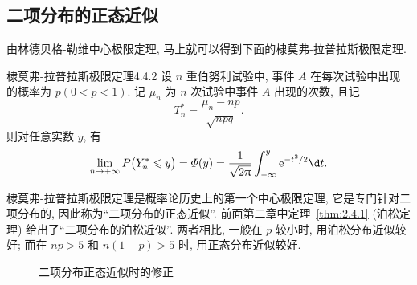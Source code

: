 \subsection{二项分布的正态近似}

由林德贝格-勒维中心极限定理, 马上就可以得到下面的棣莫弗-拉普拉斯极限定理.

\begin{theorem}{棣莫弗-拉普拉斯极限定理}{4.4.2}
    设 $n$ 重伯努利试验中, 事件 $A$ 在每次试验中出现的概率为 $ p (0<p<1) $.
    记 $ \mu_n $ 为 $n$ 次试验中事件 $A$ 出现的次数, 且记
    \begin{equation*}
        T_n^* = \frac{\mu_n - np}{\sqrt{npq}}.
    \end{equation*}
    则对任意实数 $y$, 有
    \begin{equation*}
        \lim_{n \to +\infty} P \bigl( Y_n^* \leq y \bigr) = \Phi (y) = \frac{1}{\sqrt{2\pi}} \int_{-\infty}^{y} \ee^{-t^2/2} \d t.
    \end{equation*}
\end{theorem}

棣莫弗-拉普拉斯极限定理是概率论历史上的第一个中心极限定理, 它是专门针对二项分布的, 因此称为``二项分布的正态近似''.
前面第二章中定理~\ref{thm:2.4.1} (泊松定理) 给出了``二项分布的泊松近似''.
两者相比, 一般在 $p$ 较小时, 用泊松分布近似较好; 而在 $ np>5 $ 和 $ n (1-p)>5 $ 时, 用正态分布近似较好.

\begin{figure}
    \centering
    \caption{二项分布正态近似时的修正}\label{fig:4.4.2}
\end{figure}

